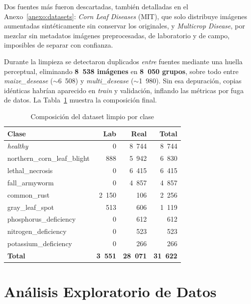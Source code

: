 \documentclass[12pt,letterpaper]{article}
\begin{document}
Dos fuentes m\'as fueron descartadas, tambi\'en detalladas en el Anexo~\ref{anexo:datasets}: \textit{Corn Leaf Diseases} (MIT), que solo distribuye im\'agenes aumentadas sint\'eticamente sin conservar los originales, y \textit{Multicrop Disease}, por mezclar sin metadatos im\'agenes preprocesadas, de laboratorio y de campo, imposibles de separar con confianza.

Durante la limpieza se detectaron duplicados \emph{entre} fuentes mediante una huella perceptual, eliminando \textbf{8~538 im\'agenes} en \textbf{8~050 grupos}, sobre todo entre \textit{maize\_desease} ($\sim$6~508) y \textit{multi\_desease} ($\sim$1~980). Sin esa depuraci\'on, copias id\'enticas habr\'ian aparecido en \textit{train} y validaci\'on, inflando las m\'etricas por fuga de datos. La Tabla~\ref{tab:classes} muestra la composici\'on final.

\begin{table}[H]
\caption{Composici\'on del dataset limpio por clase}
\label{tab:classes}
\centering
\small
\begin{singlespace}
\begin{tabular}{lrrr}
\toprule
\textbf{Clase} & \textbf{Lab} & \textbf{Real} & \textbf{Total} \\
\midrule
\textit{healthy} & 0 & 8~744 & 8~744 \\
northern\_corn\_leaf\_blight & 888 & 5~942 & 6~830 \\
lethal\_necrosis & 0 & 6~415 & 6~415 \\
fall\_armyworm & 0 & 4~857 & 4~857 \\
common\_rust & 2~150 & 106 & 2~256 \\
gray\_leaf\_spot & 513 & 606 & 1~119 \\
phosphorus\_deficiency & 0 & 612 & 612 \\
nitrogen\_deficiency & 0 & 523 & 523 \\
potassium\_deficiency & 0 & 266 & 266 \\
\midrule
\textbf{Total} & \textbf{3~551} & \textbf{28~071} & \textbf{31~622} \\
\bottomrule
\end{tabular}
\end{singlespace}
\end{table}

\section{An\'alisis Exploratorio de Datos}
\label{sec:eda}
\end{document}
